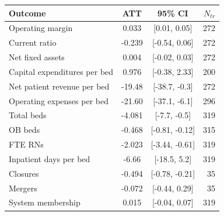 \begin{tabular}[t]{lccr}
\toprule
Outcome & ATT & 95\% CI & $N_{tr}$ \\
\midrule
Operating margin & 0.033 & [0.01, 0.05] & 272 \\
Current ratio & -0.239 & [-0.54, 0.06] & 272 \\
Net fixed assets & 0.004 & [-0.02, 0.03] & 272 \\
Capital expenditures per bed & 0.976 & [-0.38, 2.33] & 200 \\
Net patient revenue per bed & -19.48 & [-38.7, -0.3] & 272 \\
Operating expenses per bed & -21.60 & [-37.1, -6.1] & 296 \\
\addlinespace
Total beds & -4.081 & [-7.7, -0.5] & 319 \\
OB beds & -0.468 & [-0.81, -0.12] & 315 \\
FTE RNs & -2.023 & [-3.44, -0.61] & 319 \\
Inpatient days per bed & -6.66 & [-18.5, 5.2] & 319 \\
\addlinespace
Closures & -0.494 & [-0.78, -0.21] & 35 \\
Mergers & -0.072 & [-0.44, 0.29] & 35 \\
System membership & 0.015 & [-0.04, 0.07] & 319 \\
\bottomrule
\end{tabular}
